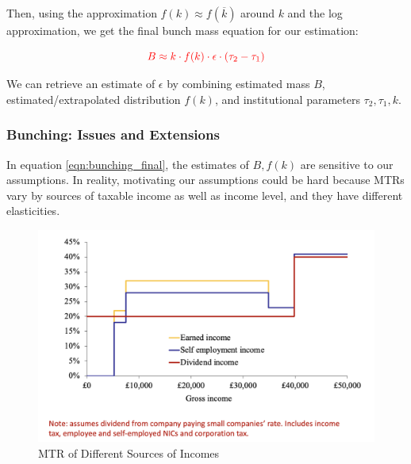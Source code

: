                 Then, using the approximation $f(k) \approx f(\overline{k})$ around $k$ and the log approximation, we get the final bunch mass equation for our estimation:

                \begin{equation}
                    \color{red}
                    B \approx k\cdot f(k) \cdot \epsilon \cdot (\tau_2 - \tau_1)
                    \label{eqn:bunching_final}
                \end{equation}

                We can retrieve an estimate of $\epsilon$ by combining estimated mass $B$, estimated/extrapolated distribution $f(k)$, and institutional parameters $\tau_2,\tau_1,k$.

            \subsubsection{Bunching: Issues and Extensions}

                In equation \ref{eqn:bunching_final}, the estimates of $B,f(k)$ are sensitive to our assumptions. In reality, motivating our assumptions could be hard because MTRs vary by sources of taxable income as well as income level, and they have different elasticities.

                \begin{figure}[H]
                    \centering
                    \includegraphics[width=4.5in]{images/ch13/13_bunching_4.png}
                    \caption{MTR of Different Sources of Incomes}
                \end{figure}

